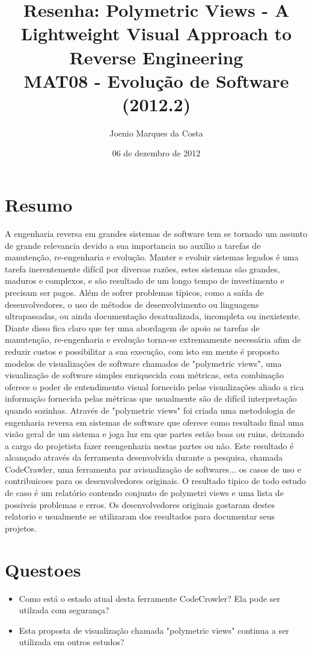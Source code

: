 \documentclass[12pt]{article}
\title{Resenha: Polymetric Views - A Lightweight Visual Approach to Reverse Engineering\cite{PolymetricViews} \\
 \large MAT08 - Evolução de Software (2012.2)}
\author{Joenio Marques da Costa}
\date{06 de dezembro de 2012}
\begin{document}
\maketitle

\section{Resumo}

A engenharia reversa em grandes sistemas de software tem se tornado um assunto
de grande relevancia devido a sua importancia no auxílio a tarefas de
manutenção, re-engenharia e evolução. Manter e evoluir sistemas legados é uma
tarefa inerentemente difícil por diversas razões, estes sistemas são grandes,
maduros e complexos, e são resultado de um longo tempo de investimento e
precisam ser pagos. Além de sofrer problemas típicos, como a saída de
desenvolvedores, o uso de métodos de desenvolvimento ou linguagens
ultrapassadas, ou ainda documentação desatualizada, incompleta ou inexistente.
Diante disso fica claro que ter uma abordagem de apoio as tarefas de
manutenção, re-engenharia e evolução torna-se extremamente necessária afim de
reduzir custos e possibilitar a sua execução, com isto em mente é proposto
modelos de visualizações de software chamados de "polymetric views", uma
visualização de software simples enriquecida com métricas, esta combinação
oferece o poder de entendimento visual fornecido pelas visualizações aliado a
rica informação fornecida pelas métricas que usualmente são de difícil
interpretação quando sozinhas. Através de "polymetric views" foi criada uma metodologia de
engenharia reversa em sistemas de software que oferece como resultado final uma
visão geral de um sistema e joga luz em que partes estão boas ou ruins,
deixando a cargo do projetista fazer reengenharia nestas partes ou não. Este
resultado é alcançado através da ferramenta desenvolvida durante a pesquisa,
chamada CodeCrawler, uma ferramenta par avisualização de softwares... os casos
de uso e contribuicoes para os desenvolvedores originais. O resultado tipico de
todo estudo de caso é um relatório contendo conjunto de polymetri views e uma
lista de possiveis problemas e erros. Os desenvolvedores originais gostaram
destes relatorio e usualmente se utilizaram dos resultados para documentar seus
projetos.

\section{Questoes}

\begin{itemize}
  \item Como está o estado atual desta ferramente CodeCrowler? Ela pode ser utilzada com segurança?
  \item Esta proposta de visualização chamada "polymetric views" continua a ser utilizada em outros estudos?
\end{itemize}


\end{document}
